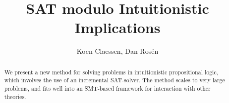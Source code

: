 \documentclass{llncs}
\begin{document}
\title{ SAT modulo Intuitionistic Implications
      }

\author{ Koen Claessen, Dan Ros{\'e}n
       }


\maketitle










\begin{abstract}

We present a new method for solving problems in intuitionistic propositional
logic, which involves the use of an incremental SAT-solver. The method scales
to very large problems, and fits well into an SMT-based framework for interaction with other theories.

\end{abstract}

\end{document}
